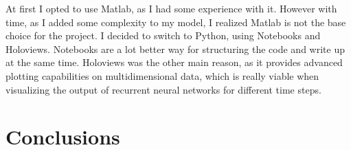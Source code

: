 At first I opted to use Matlab, as I had some experience with it. However with time, as I added some complexity to my model, I realized Matlab is not the base choice for the project. I decided to switch to Python, using Notebooks and Holoviews. Notebooks are a lot better way for structuring the code and write up at the same time. Holoviews was the other main reason, as it provides advanced plotting capabilities on multidimensional data, which is really viable when visualizing the output of recurrent neural networks for different time steps.


\chapter{Conclusions}






